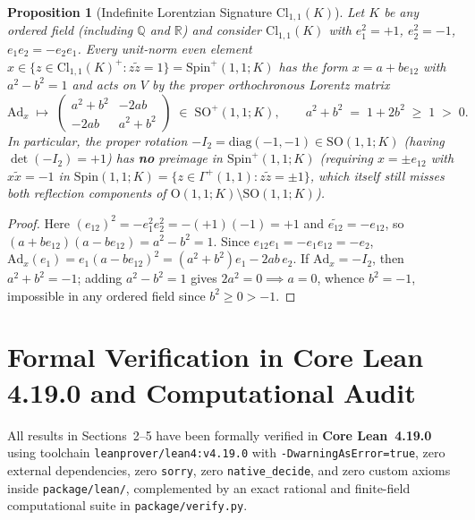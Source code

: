 \documentclass[11pt]{article}
\newtheorem{proposition}[theorem]{Proposition}
\theoremstyle{definition}
\theoremstyle{remark}
\newcommand{\Cl}{\mathrm{Cl}}
\newcommand{\Spin}{\mathrm{Spin}}
\newcommand{\Ad}{\mathrm{Ad}}
\newcommand{\SO}{\mathrm{SO}}
\newcommand{\Orth}{\mathrm{O}}
\begin{document}
\begin{proposition}[Indefinite Lorentzian Signature $\Cl_{1,1}(K)$]\label{prop:lorentz}
Let $K$ be any ordered field (including $\mathbb{Q}$ and $\mathbb{R}$) and consider $\Cl_{1,1}(K)$ with $e_1^2 = +1$, $e_2^2 = -1$, $e_1 e_2 = -e_2 e_1$. Every unit-norm even element $x \in \{z \in \Cl_{1,1}(K)^+ : z \widetilde{z} = 1\} = \Spin^+(1,1;K)$ has the form $x = a + b e_{12}$ with $a^2 - b^2 = 1$ and acts on $V$ by the proper orthochronous Lorentz matrix
\[
\Ad_x \;\longmapsto\; \begin{pmatrix} a^2 + b^2 & -2ab \\ -2ab & a^2 + b^2 \end{pmatrix} \;\in\; \SO^+(1,1;K), \qquad a^2 + b^2 \;=\; 1 + 2b^2 \;\ge\; 1 \;>\; 0.
\]
In particular, the proper rotation $-I_2 = \mathrm{diag}(-1,-1) \in \SO(1,1;K)$ (having $\det(-I_2) = +1$) has \textbf{no} preimage in $\Spin^+(1,1;K)$ (requiring $x = \pm e_{12}$ with $x \widetilde{x} = -1$ in $\Spin(1,1;K) = \{z \in \Gamma^+(1,1) : z \widetilde{z} = \pm 1\}$, which itself still misses both reflection components of $\Orth(1,1;K) \setminus \SO(1,1;K)$).
\end{proposition}

\begin{proof}
Here $(e_{12})^2 = -e_1^2 e_2^2 = -(+1)(-1) = +1$ and $\widetilde{e_{12}} = -e_{12}$, so $(a + b e_{12})(a - b e_{12}) = a^2 - b^2 = 1$. Since $e_{12} e_1 = -e_1 e_{12} = -e_2$, $\Ad_x(e_1) = e_1 (a - b e_{12})^2 = (a^2 + b^2) e_1 - 2ab\, e_2$. If $\Ad_x = -I_2$, then $a^2 + b^2 = -1$; adding $a^2 - b^2 = 1$ gives $2a^2 = 0 \implies a = 0$, whence $b^2 = -1$, impossible in any ordered field since $b^2 \ge 0 > -1$.
\end{proof}

\section{Formal Verification in Core Lean 4.19.0 and Computational Audit}

All results in Sections~2--5 have been formally verified in \textbf{Core Lean~4.19.0} using toolchain \nolinkurl{leanprover/lean4:v4.19.0} with \nolinkurl{-DwarningAsError=true}, zero external dependencies, zero \nolinkurl{sorry}, zero \nolinkurl{native_decide}, and zero custom axioms inside \nolinkurl{package/lean/}, complemented by an exact rational and finite-field computational suite in \nolinkurl{package/verify.py}.
\end{document}
